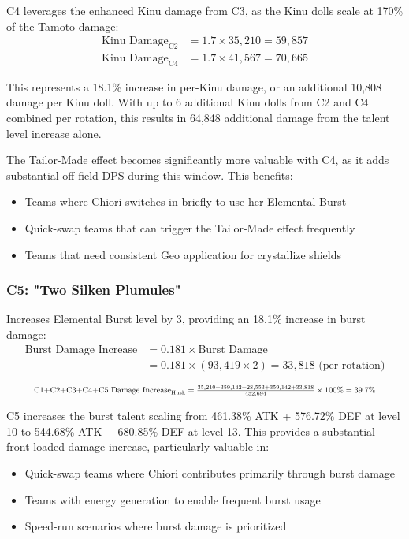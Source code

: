 \documentclass[12pt,a4paper]{article}
\begin{document}
C4 leverages the enhanced Kinu damage from C3, as the Kinu dolls scale at 170\% of the Tamoto damage:
\begin{align}
\text{Kinu Damage}_{\text{C2}} &= 1.7 \times 35,210 = 59,857 \\
\text{Kinu Damage}_{\text{C4}} &= 1.7 \times 41,567 = 70,665
\end{align}

This represents a 18.1\% increase in per-Kinu damage, or an additional 10,808 damage per Kinu doll. With up to 6 additional Kinu dolls from C2 and C4 combined per rotation, this results in 64,848 additional damage from the talent level increase alone.

The Tailor-Made effect becomes significantly more valuable with C4, as it adds substantial off-field DPS during this window. This benefits:
\begin{itemize}
    \item Teams where Chiori switches in briefly to use her Elemental Burst
    \item Quick-swap teams that can trigger the Tailor-Made effect frequently
    \item Teams that need consistent Geo application for crystallize shields
\end{itemize}

\subsubsection{C5: "Two Silken Plumules"}
Increases Elemental Burst level by 3, providing an 18.1\% increase in burst damage:
\begin{align}
\text{Burst Damage Increase} &= 0.181 \times \text{Burst Damage} \\
&= 0.181 \times (93,419 \times 2) = 33,818 \text{ (per rotation)} \\
\end{align}
\[
\resizebox{.9\textwidth}{!}{$
  \text{C1+C2+C3+C4+C5 Damage Increase}_{\text{Husk}}
  =\frac{35,210+359,142+28,553+359,142+33,818}{452,694}\times100\%
  =39.7\%
$}
\]


C5 increases the burst talent scaling from 461.38\% ATK + 576.72\% DEF at level 10 to 544.68\% ATK + 680.85\% DEF at level 13. This provides a substantial front-loaded damage increase, particularly valuable in:
\begin{itemize}
    \item Quick-swap teams where Chiori contributes primarily through burst damage
    \item Teams with energy generation to enable frequent burst usage
    \item Speed-run scenarios where burst damage is prioritized
\end{itemize}
\end{document}
